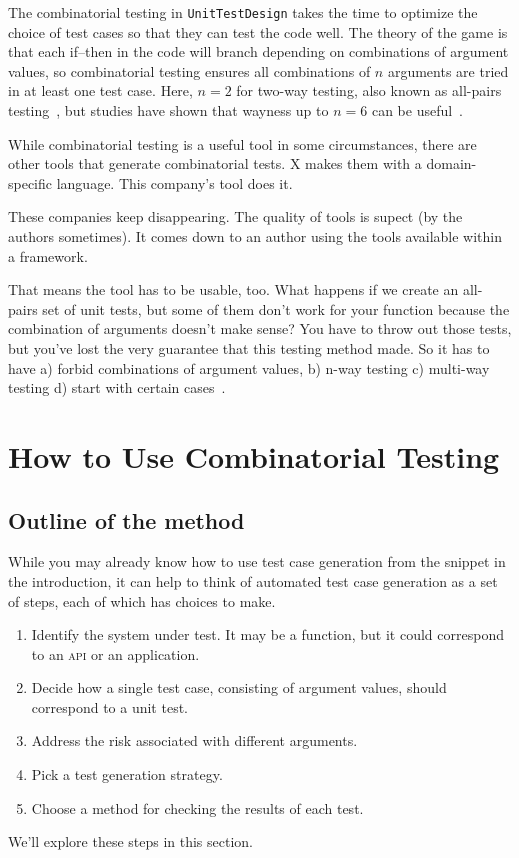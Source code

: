 \documentclass{juliacon}
\newcommand{\utd}{\texttt{UnitTestDesign}\xspace}
\begin{document}
\vskip 6pt
The combinatorial testing in \utd takes the time to optimize the choice of test cases so that they can test the code well. The theory of the game is that each if--then in the code will branch depending on combinations of argument values, so combinatorial testing ensures all combinations of $n$ arguments are tried in at least one test case. Here, $n=2$ for two-way testing, also known as all-pairs testing~\cite{pairwise-website}, but studies have shown that wayness up to $n=6$ can be useful~\cite{Petke2015-ex}.

\vskip 6pt
While combinatorial testing is a useful tool in some circumstances, there are other tools that generate combinatorial tests. X makes them with a domain-specific language. This company's tool does it.

\vskip 6pt
These companies keep disappearing. The quality of tools is supect (by the authors sometimes). It comes down to an author using the tools available within a framework.

\vskip 6pt
That means the tool has to be usable, too. What happens if we create an all-pairs set of unit tests, but some of them don't work for your function because the combination of arguments doesn't make sense? You have to throw out those tests, but you've lost the very guarantee that this testing method made.
So it has to have a) forbid combinations of argument values, b) n-way testing c) multi-way testing d) start with certain cases~\cite{Czerwonka2006-hm}.


\section{How to Use Combinatorial Testing}\label{sec:how-to-use}

\subsection{Outline of the method}

While you may already know how to use test case generation from the snippet in the introduction, it can help to think of automated test case generation as a set of steps, each of which has choices to make.
\begin{enumerate}
   \item Identify the system under test. It may be a function, but it could correspond to an \textsc{api} or an application.
   \item Decide how a single test case, consisting of argument values, should correspond to a unit test.
   \item Address the risk associated with different arguments.
   \item Pick a test generation strategy.
   \item Choose a method for checking the results of each test.
\end{enumerate}
We'll explore these steps in this section.
\end{document}
